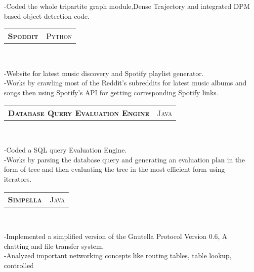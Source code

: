\documentclass[10pt,a4paper,oneside]{article}
\begin{document}
\begin{minipage}[t]{0.63\textwidth}
\begin{adjustwidth}{7pt}{0pt}
{        -Coded the whole tripartite graph module,Dense
        Trajectory and integrated DPM based object detection code.}\\
        \end{adjustwidth}
        \begin{tabular}{c|c}
            \textbf{\normalsize S\textsc{poddit}}
            &\textmd{\normalsize P\textsc{ython}}
        \end{tabular}\\
         \vspace{-4mm}
        \begin{adjustwidth}{7pt}{0pt}
        {\footnotesize -Website for latest music
        discovery and Spotify playlist generator.\\
        -Works by crawling most of the Reddit's subreddits for
        latest music albums and songs then using Spotify's API for
        getting corresponding Spotify links.}\\
        \end{adjustwidth}
        \begin{tabular}{c|c}
            \textbf{\normalsize D\textsc{atabase} Q\textsc{uery}
            E\textsc{valuation} E\textsc{ngine}}
            &\textmd{\normalsize J\textsc{ava}}
        \end{tabular}\\
         \vspace{-4mm}
        \begin{adjustwidth}{7pt}{0pt}
        {\footnotesize -Coded a SQL query Evaluation Engine.\\
        -Works by parsing the database query and generating an evaluation plan in the form of tree and then evaluating the tree in the most efficient form using iterators.}\\
        \end{adjustwidth}
        \begin{tabular}{c|c}
            \textbf{\normalsize S\textsc{impella}}
            &\textmd{\normalsize J\textsc{ava}}
        \end{tabular}\\
         \vspace{-4mm}
        \begin{adjustwidth}{7pt}{0pt}
        {\footnotesize -Implemented a simplified version of the
        Gnutella Protocol Version 0.6, A chatting and file transfer
        system.\\
        -Analyzed important networking concepts like routing tables, table lookup, controlled
}
\end{adjustwidth}
\end{minipage}
\end{document}

